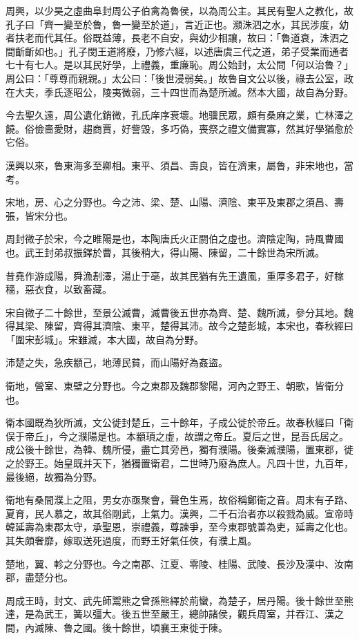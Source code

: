 \begin{pinyinscope}
周興，以少昊之虛曲阜封周公子伯禽為魯侯，以為周公主。其民有聖人之教化，故孔子曰「齊一變至於魯，魯一變至於道」，言近正也。瀕洙泗之水，其民涉度，幼者扶老而代其任。俗既益薄，長老不自安，與幼少相讓，故曰：「魯道衰，洙泗之間齗齗如也。」孔子閔王道將廢，乃修六經，以述唐虞三代之道，弟子受業而通者七十有七人。是以其民好學，上禮義，重廉恥。周公始封，太公問「何以治魯？」周公曰：「尊尊而親親。」太公曰：「後世浸弱矣。」故魯自文公以後，祿去公室，政在大夫，季氏逐昭公，陵夷微弱，三十四世而為楚所滅。然本大國，故自為分野。

今去聖久遠，周公遺化銷微，孔氏庠序衰壞。地骥民眾，頗有桑麻之業，亡林澤之饒。俗儉嗇愛財，趨商賈，好訾毀，多巧偽，喪祭之禮文備實寡，然其好學猶愈於它俗。

漢興以來，魯東海多至卿相。東平、須昌、壽良，皆在濟東，屬魯，非宋地也，當考。

宋地，房、心之分野也。今之沛、梁、楚、山陽、濟陰、東平及東郡之須昌、壽張，皆宋分也。

周封微子於宋，今之睢陽是也，本陶唐氏火正閼伯之虛也。濟陰定陶，詩風曹國也。武王封弟叔振鐸於曹，其後稍大，得山陽、陳留，二十餘世為宋所滅。

昔堯作游成陽，舜漁剨澤，湯止于亳，故其民猶有先王遺風，重厚多君子，好稼穡，惡衣食，以致畜藏。

宋自微子二十餘世，至景公滅曹，滅曹後五世亦為齊、楚、魏所滅，參分其地。魏得其梁、陳留，齊得其濟陰、東平，楚得其沛。故今之楚彭城，本宋也，春秋經曰「圍宋彭城」。宋雖滅，本大國，故自為分野。

沛楚之失，急疾顓己，地薄民貧，而山陽好為姦盜。

衛地，營室、東壁之分野也。今之東郡及魏郡黎陽，河內之野王、朝歌，皆衛分也。

衛本國既為狄所滅，文公徙封楚丘，三十餘年，子成公徙於帝丘。故春秋經曰「衛俣于帝丘」，今之濮陽是也。本顓頊之虛，故謂之帝丘。夏后之世，昆吾氏居之。成公後十餘世，為韓、魏所侵，盡亡其旁邑，獨有濮陽。後秦滅濮陽，置東郡，徙之於野王。始皇既并天下，猶獨置衛君，二世時乃廢為庶人。凡四十世，九百年，最後絕，故獨為分野。

衛地有桑間濮上之阻，男女亦亟聚會，聲色生焉，故俗稱鄭衛之音。周末有子路、夏育，民人慕之，故其俗剛武，上氣力。漢興，二千石治者亦以殺戮為威。宣帝時韓延壽為東郡太守，承聖恩，崇禮義，尊諫爭，至今東郡號善為吏，延壽之化也。其失頗奢靡，嫁取送死過度，而野王好氣任俠，有濮上風。

楚地，翼、軫之分野也。今之南郡、江夏、零陵、桂陽、武陵、長沙及漢中、汝南郡，盡楚分也。

周成王時，封文、武先師鬻熊之曾孫熊繹於荊蠻，為楚子，居丹陽。後十餘世至熊達，是為武王，簧以彊大。後五世至嚴王，總帥諸侯，觀兵周室，并吞江、漢之間，內滅陳、魯之國。後十餘世，頃襄王東徙于陳。


\end{pinyinscope}
